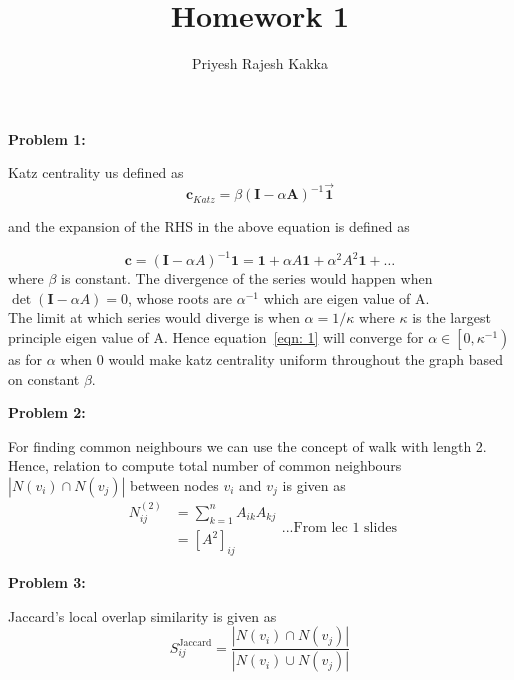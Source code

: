 \documentclass[11pt]{article}
\title{Homework 1}
\author{Priyesh Rajesh Kakka}
\begin{document}
	
	\maketitle
	
	\textbf{Problem 1:}
	
	Katz centrality us defined as \\
	
	\begin{equation}
		\label{eqn: 1}
		\boldsymbol{c}_{K a t z}=\beta(\boldsymbol{I}-\alpha \boldsymbol{A})^{-1} \overrightarrow{\mathbf{1}}
	\end{equation}
	
	and the expansion of the RHS in the above equation is defined as 
	
	\begin{equation}
		\boldsymbol{c} = (\mathbf{I}-\alpha A)^{-1} \mathbf{1}=\mathbf{1}+\alpha A \mathbf{1}+\alpha^2 A^2 \mathbf{1}+\ldots
	\end{equation}
	where $\beta$ is constant. 
	The divergence of the series would happen when $\operatorname{det}(\mathbf{I}-\alpha A)=0$, whose roots are $\alpha^{-1}$ which are eigen value of A.\\
	The limit at which series would diverge is when $\alpha = 1/\kappa$ where $\kappa$ is the largest principle eigen value of A. Hence equation~\ref{eqn: 1} will converge for $\alpha \in\left[0, \kappa^{-1}\right)$ as for $\alpha$ when 0 would make katz centrality uniform throughout the graph based on constant $\beta$.
	
	
	\clearpage
	
	
	\textbf{Problem 2:}
	
	For finding common neighbours we can use the concept of walk with length 2. Hence, relation to compute total number of common neighbours $\left|N\left(v_i\right) \cap N\left(v_j\right)\right|$ between nodes $v_i$ and $v_j$ is given as 
	\begin{equation}
		\label{eqn: 2}
		\begin{aligned}
			N_{i j}^{(2)} &=\sum_{k=1}^n A_{i k} A_{k j} \\
			&=\left[A^2\right]_{i j}
		\end{aligned}...\text{From lec 1 slides}
	\end{equation}
	\clearpage
	
	\textbf{Problem 3:}
	
	Jaccard's local overlap similarity is given as 
	\begin{equation}
		S_{i j}^{\mathrm{Jaccard}}=\frac{\left|N\left(v_i\right) \cap N\left(v_j\right)\right|}{\left|N\left(v_i\right) \cup N\left(v_j\right)\right|}
	\end{equation}
	
\end{document}
